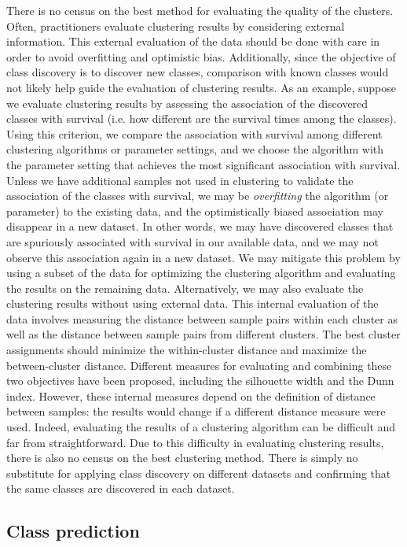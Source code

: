 There is no census on the best method for evaluating the quality of the clusters. Often, practitioners evaluate clustering results by considering external information. This external evaluation of the data should be done with care in order to avoid overfitting and optimistic bias. Additionally, since the objective of class discovery is to discover new classes, comparison with known classes would not likely help guide the evaluation of clustering results. As an example, suppose we evaluate clustering results by assessing the association of the discovered classes with survival (i.e. how different are the survival times among the classes). Using this criterion, we compare the association with survival among different clustering algorithms or parameter settings, and we choose the algorithm with the parameter setting that achieves the most significant association with survival. Unless we have additional samples not used in clustering to validate the association of the classes with survival, we may be \emph{overfitting} the algorithm (or parameter) to the existing data, and the optimistically biased association may disappear in a new dataset. In other words, we may have discovered classes that are spuriously associated with survival in our available data, and we may not observe this association again in a new dataset. We may mitigate this problem by using a subset of the data for optimizing the clustering algorithm and evaluating the results on the remaining data. Alternatively, we may also evaluate the clustering results without using external data. This internal evaluation of the data involves measuring the distance between sample pairs within each cluster as well as the distance between sample pairs from different clusters. The best cluster assignments should minimize the within-cluster distance and maximize the between-cluster distance. Different measures for evaluating and combining these two objectives have been proposed, including the silhouette width and the Dunn index. However, these internal measures depend on the definition of distance between samples: the results would change if a different distance measure were used. Indeed, evaluating the results of a clustering algorithm can be difficult and far from straightforward. Due to this difficulty in evaluating clustering results, there is also no census on the best clustering method. There is simply no substitute for applying class discovery on different datasets and confirming that the same classes are discovered in each dataset.

\subsection{Class prediction}

